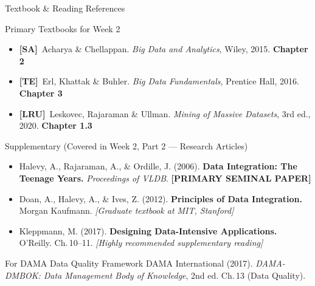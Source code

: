 \documentclass[aspectratio=169,10pt]{beamer}
\begin{document}
\begin{frame}{Textbook \& Reading References}
  \begin{block}{Primary Textbooks for Week 2}
    \begin{itemize}
      \item \textbf{[SA]}\ Acharya \& Chellappan. \textit{Big Data and Analytics}, Wiley, 2015.
            \hfill \textbf{Chapter 2}
      \item \textbf{[TE]}\ Erl, Khattak \& Buhler. \textit{Big Data Fundamentals}, Prentice Hall, 2016.
            \hfill \textbf{Chapter 3}
      \item \textbf{[LRU]}\ Leskovec, Rajaraman \& Ullman. \textit{Mining of Massive Datasets}, 3rd ed., 2020.
            \hfill \textbf{Chapter 1.3}
    \end{itemize}
  \end{block}
  \vspace{6pt}
  \begin{exampleblock}{Supplementary (Covered in Week 2, Part 2 — Research Articles)}
    \begin{itemize}
      \small
      \item Halevy, A., Rajaraman, A., \& Ordille, J. (2006). \textbf{Data Integration: The Teenage Years.} \textit{Proceedings of VLDB}. \textbf{[PRIMARY SEMINAL PAPER]}
      \item Doan, A., Halevy, A., \& Ives, Z. (2012). \textbf{Principles of Data Integration.} Morgan Kaufmann. \textit{[Graduate textbook at MIT, Stanford]}
      \item Kleppmann, M. (2017). \textbf{Designing Data-Intensive Applications.} O'Reilly. Ch.\,10--11. \textit{[Highly recommended supplementary reading]}
    \end{itemize}
  \end{exampleblock}
  \vspace{4pt}
  \begin{alertblock}{For DAMA Data Quality Framework}
    \small DAMA International (2017). \textit{DAMA-DMBOK: Data Management Body of Knowledge}, 2nd ed.  Ch.\,13 (Data Quality).
  \end{alertblock}
\end{frame}
\end{document}
